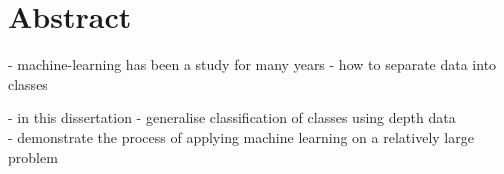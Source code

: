 \documentclass[dissertation.tex]{subfiles}
\begin{document}
\chapter{Abstract}
- machine-learning has been a study for many years
- how to separate data into classes

- in this dissertation 
- generalise classification of classes using depth data\\
- demonstrate the process of applying machine learning on a relatively large problem\\
\end{document}
